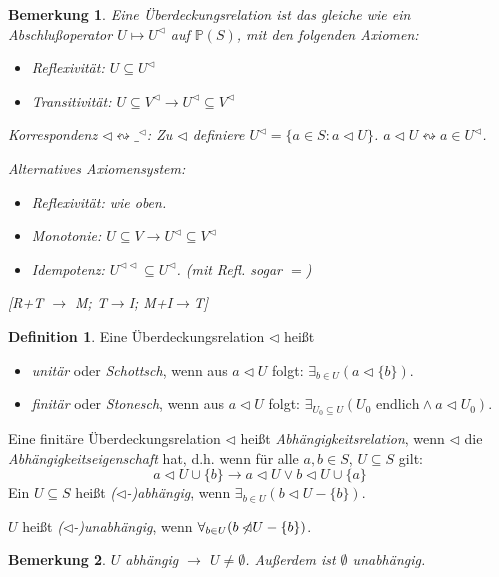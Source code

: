 \documentclass[headsepline=true,DIV=11]{scrartcl}
\newtheorem*{remark}{Bemerkung}
\theoremstyle{definition}
\newtheorem*{definition}{Definition}
\newcommand{\nlhd}{\not\!\!\lhd} %
\begin{document}
\begin{remark}
	Eine Überdeckungsrelation ist das gleiche wie ein {\em Abschlußoperator} $U\mapsto U^{\lhd}$ auf $\mathbb P(S)$, mit den folgenden Axiomen:
	\begin{itemize}
		\item {\em Reflexivität}: $U\subseteq U^\lhd$
		\item {\em Transitivität}: $U\subseteq V^\lhd \to U^\lhd \subseteq V^\lhd$ %
	\end{itemize}
	Korrespondenz $\lhd \leftrightsquigarrow \_^{\lhd}$:
	Zu $\lhd$ definiere $U^\lhd= \{a\in S: a\lhd U\}$.
	$a\lhd U \leftrightsquigarrow a\in U^\lhd$.

	Alternatives Axiomensystem:
	\begin{itemize}
		\item Reflexivität: wie oben.
		\item Monotonie: $U\subseteq V \to U^\lhd \subseteq V^\lhd$
		\item Idempotenz: $U^{\lhd\lhd} \subseteq U^{\lhd}$. (mit Refl. sogar $=$)
	\end{itemize}
	[R+T $\to$ M; T$\to$I; M+I$\to$T]
\end{remark}

\begin{definition}
	Eine Überdeckungsrelation $\lhd$ heißt
	\begin{itemize}
		\item {\em unitär} oder {\em Schottsch}, wenn aus $a\lhd U$ folgt: $\exists_{b\in U}(a\lhd\{b\})$.
		\item {\em finitär} oder {\em Stonesch}, wenn aus $a\lhd U$ folgt: $\exists_{U_0\subseteq U} (U_0 \text{ endlich} \land a\lhd U_0)$.
	\end{itemize}
	Eine finitäre Überdeckungsrelation $\lhd$ heißt {\em Abhängigkeitsrelation}, wenn $\lhd$ die {\em Abhängigkeitseigenschaft} hat, d.h.
	wenn für alle $a,b\in S$, $U\subseteq S$ gilt: 
	\[ a\lhd U\cup\{b\}\to a\lhd U\lor b\lhd U\cup\{a\}\]
	Ein $U\subseteq S$ heißt {\em ($\lhd$-)abhängig}, wenn $\exists_{b\in U}(b\lhd U-\{b\})$.
	
	$U$ heißt {\em ($\lhd$-)unabhängig}, wenn  $\forall_{b\in U}(b\nlhd U-\{b\})$.
\end{definition}

\begin{remark}
	$U$ abhängig $\to$ $U\neq\emptyset$. Außerdem ist $\emptyset$ unabhängig.
\end{remark}
\end{document}
